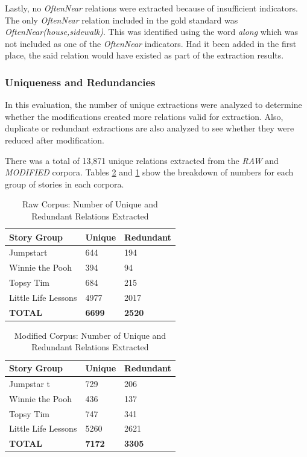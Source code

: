 Lastly, no \textit{OftenNear} relations were extracted because of insufficient indicators. The only \textit{OftenNear} relation included in the gold standard was \textit{OftenNear(house,sidewalk)}. This was identified using the word \textit{along} which was not included as one of the \textit{OftenNear} indicators. Had it been added in the first place, the said relation would have existed as part of the extraction results.  

\subsubsection{Uniqueness and Redundancies}

In this evaluation, the number of unique extractions were analyzed to determine whether the modifications created more relations valid for extraction. Also, duplicate or redundant extractions are also analyzed to see whether they were reduced after modification.

There was a total of 13,871 unique relations extracted from the \textit{RAW} and \textit{MODIFIED} corpora. Tables \ref{tab:modifiedtotal} and \ref{tab:rawtotal} show the breakdown of numbers for each group of stories in each corpora.

\begin{table}[H]   %
\centering
\caption{Raw Corpus: Number of Unique and Redundant Relations Extracted} \vspace{0.25em}
\begin{tabular}{|p{4cm}|p{3cm}|p{3cm}|} \hline
\textbf{Story Group} & \textbf{Unique} & \textbf{Redundant} \\ \hline
Jumpstart & 644 & 194 \\ \hline
Winnie the Pooh & 394 & 94 \\ \hline
Topsy Tim & 684 & 215 \\ \hline
Little Life Lessons & 4977 & 2017 \\ \hline
\textbf{TOTAL} & \textbf{6699} & \textbf{2520} \\ \hline
\end{tabular}
\label{tab:rawtotal}
\end{table}

\begin{table}[H]   %
\centering
\caption{Modified Corpus: Number of Unique and Redundant Relations Extracted} \vspace{0.25em}
\begin{tabular}{|p{4cm}|p{3cm}|p{3cm}|} \hline
\textbf{Story Group} & \textbf{Unique} & \textbf{Redundant} \\ \hline
Jumpstar
t & 729 & 206 \\ \hline
Winnie the Pooh & 436 & 137 \\ \hline
Topsy Tim & 747 & 341 \\ \hline
Little Life Lessons & 5260 & 2621 \\ \hline
\textbf{TOTAL} & \textbf{7172} & \textbf{3305} \\ \hline
\end{tabular}
\label{tab:modifiedtotal}
\end{table}


